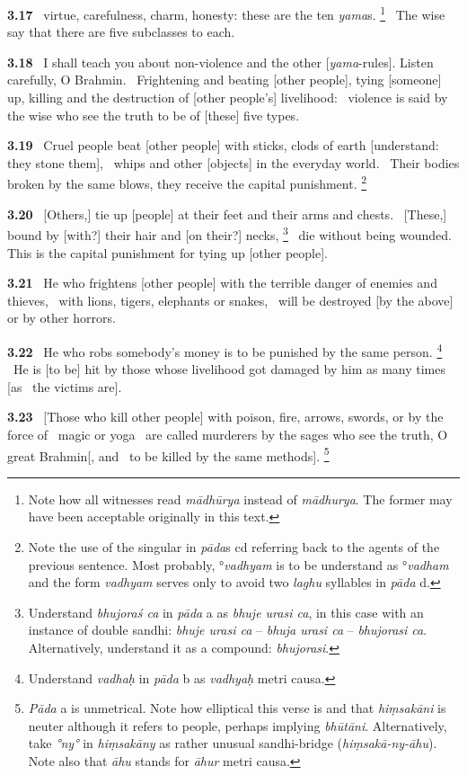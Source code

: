 \documentclass{article}
\newcommand{\skt}[1]{\textit{#1}}
\begin{document}
\textbf{3.17}%
\ virtue, carefulness, charm, honesty: these are the ten \skt{yama}s.%
\footnote{Note how all witnesses read \skt{mādhūrya} instead of \skt{mādhurya}. The former may have been                acceptable originally in this text. }%
\ The wise say that there are five subclasses to each.%


\textbf{3.18}%
\ I shall teach you about non-violence and the other [\skt{yama}-rules]. Listen carefully, O Brahmin.%
\ Frightening and beating [other people], tying [someone] up, killing and the destruction of [other people's] livelihood:%
\ violence is said by the wise who see the truth to be of [these] five types.%


\textbf{3.19}%
\ Cruel people beat [other people] with sticks, clods of earth [understand: they stone them],%
\                         whips and other [objects] in the everyday world.%
\ Their bodies broken by the same blows, they receive the capital punishment.%
\footnote{Note the use of the singular in \skt{pāda}s cd referring back to the agents of the previous sentence.                Most probably, °\skt{vadhyam} is to be understand as °\skt{vadham} and the form                         \skt{vadhyam} serves only to avoid two \skt{laghu} syllables in \skt{pāda} d. }%


\textbf{3.20}%
\ [Others,] tie up [people] at their feet and their arms and chests.%
\                 [These,] bound by [with?] their hair and [on their?] necks,%
\footnote{Understand \skt{bhujoraś ca} in \skt{pāda} a as \skt{bhuje urasi ca}, in this case with an instance of double sandhi:                \skt{bhuje urasi ca} -- \skt{bhuja urasi ca} -- \skt{bhujorasi ca}. Alternatively, understand it as a compound:                                     \skt{bhujorasi}. }%
\ die without being wounded. This is the capital punishment for tying up [other people].%


\textbf{3.21}%
\ He who frightens [other people] with the terrible danger of enemies and thieves,%
\         with lions, tigers, elephants or snakes,%
\ will be destroyed [by the above] or by other horrors.%


\textbf{3.22}%
\ He who robs somebody's money is to be punished by the same person.%
\footnote{Understand \skt{vadhaḥ} in \skt{pāda} b as \skt{vadhyaḥ} metri causa. }%
\ He is [to be] hit by those whose livelihood got damaged by him as many times [as%
\                         the victims are].%


\textbf{3.23}%
\ [Those who kill other people] with poison, fire, arrows, swords, or by the force of%
\                                 magic or yoga%
\ are called murderers by the sages who see the truth, O great Brahmin[, and%
\                 to be killed by the same methods].%
\footnote{\skt{Pāda} a is unmetrical.               Note how elliptical this verse is and that \skt{hiṃsakāni} is neuter although it refers to                 people, perhaps implying \skt{bhūtāni}. Alternatively, take \skt{°ny°} in \skt{hiṃsakāny} as                 rather unusual sandhi-bridge (\skt{hiṃsakā-ny-āhu}).                 Note also that \skt{āhu} stands for \skt{āhur} metri causa. }%
\end{document}
